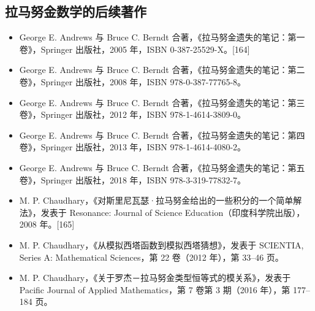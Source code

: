 \subsection{拉马努金数学的后续著作}
\begin{itemize}
\item George E. Andrews 与 Bruce C. Berndt 合著，《拉马努金遗失的笔记：第一卷》，Springer 出版社，2005 年，ISBN 0-387-25529-X。[164]
\item George E. Andrews 与 Bruce C. Berndt 合著，《拉马努金遗失的笔记：第二卷》，Springer 出版社，2008 年，ISBN 978-0-387-77765-8。
\item George E. Andrews 与 Bruce C. Berndt 合著，《拉马努金遗失的笔记：第三卷》，Springer 出版社，2012 年，ISBN 978-1-4614-3809-0。
\item George E. Andrews 与 Bruce C. Berndt 合著，《拉马努金遗失的笔记：第四卷》，Springer 出版社，2013 年，ISBN 978-1-4614-4080-2。
\item George E. Andrews 与 Bruce C. Berndt 合著，《拉马努金遗失的笔记：第五卷》，Springer 出版社，2018 年，ISBN 978-3-319-77832-7。
\item M. P. Chaudhary，《对斯里尼瓦瑟·拉马努金给出的一些积分的一个简单解法》，发表于 Resonance: Journal of Science Education（印度科学院出版），2008 年。[165]
\item M. P. Chaudhary，《从模拟西塔函数到模拟西塔猜想》，发表于 SCIENTIA, Series A: Mathematical Sciences，第 22 卷（2012 年），第 33–46 页。
\item M. P. Chaudhary，《关于罗杰－拉马努金类型恒等式的模关系》，发表于 Pacific Journal of Applied Mathematics，第 7 卷第 3 期（2016 年），第 177–184 页。
\end{itemize}